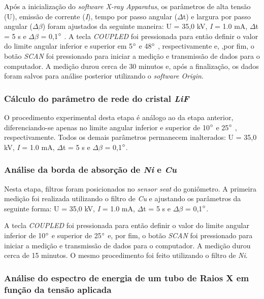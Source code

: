 \documentclass[article,12pt,openright,oneside,a4paper,brazil]{abntex2}
\begin{document}
                Após a inicialização do \textit{software X-ray Apparatus}, os parâmetros de alta tensão (U), emissão de corrente (\textit{I}), tempo por passo angular ($\Delta$t) e largura por passo angular ($\Delta$$\beta$) foram ajustados da seguinte maneira: U = 35,0 kV, \textit{I} = 1.0 mA, $\Delta$t = 5 s e $\Delta$$\beta$ = 0,1$\degree$ . A tecla \textit{COUPLED} foi pressionada para então definir o valor do limite angular inferior e superior em 5$\degree$  e 48$\degree$ , respectivamente e, ,por fim, o botão \textit{SCAN} foi pressionado para iniciar a medição e transmissão de dados para o computador. A medição durou cerca de 30 minutos e, após a finalização, os dados foram salvos para análise posterior utilizando o \textit{software Origin}.
        
            \subsubsection{Cálculo do parâmetro de rede do cristal \textit{LiF}}
                O procedimento experimental desta etapa é análogo ao da etapa anterior, diferenciando-se apenas no limite angular inferior e superior de 10$\degree$  e 25$\degree$ , respectivamente. Todos os demais parâmetros permanecem inalterados: U = 35,0 kV, \textit{I} = 1.0 mA, $\Delta$t = 5 s e $\Delta$$\beta$ = 0,1$\degree$. 
            
            \subsubsection{Análise da borda de absorção de \textit{Ni} e \textit{Cu}}
                Nesta etapa, filtros foram posicionados no \textit{sensor seat} do goniômetro. A primeira medição foi realizada utilizando o filtro de \textit{Cu} e ajustando os parâmetros da seguinte forma: U = 35,0 kV, \textit{I} = 1.0 mA, $\Delta$t = 5 s e $\Delta$$\beta$ = 0,1$\degree$.
                
                A tecla \textit{COUPLED} foi pressionada para então definir o valor do limite angular inferior de 10$\degree$  e superior de 25$\degree$  e, por fim, o botão \textit{SCAN} foi pressionado para iniciar a medição e transmissão de dados para o computador. A medição durou cerca de 15 minutos. O mesmo procedimento foi feito utilizando o filtro de \textit{Ni}.
                
            \subsubsection{Análise do espectro de energia de um tubo de Raios X em função da tensão aplicada}
            
\end{document}
